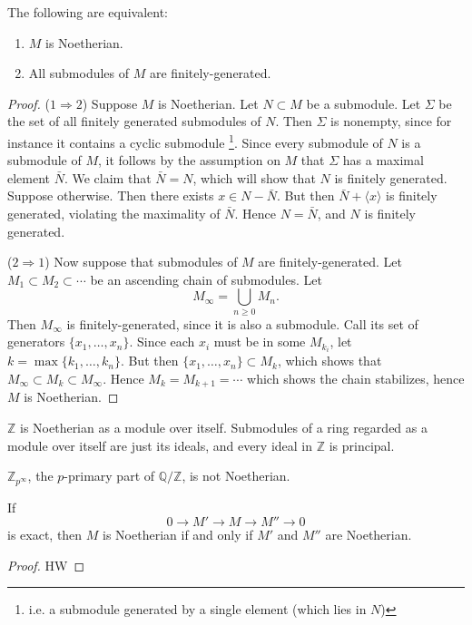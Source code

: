 \documentclass[12pt]{article}
\begin{document}
\begin{proposition}
	The following are equivalent:
	\begin{enumerate}
		\item $M$ is Noetherian.
		\item All submodules of $M$ are finitely-generated.
	\end{enumerate}
\end{proposition}
\begin{proof}
	($1\Rightarrow 2$) Suppose $M$ is Noetherian. Let $N\subset M$ be a submodule. Let $\Sigma$ be the set of all finitely generated submodules of $N$. Then $\Sigma$ is nonempty, since for instance it contains a cyclic submodule \footnote{i.e. a submodule generated by a single element (which lies in $N$)}. Since every submodule of $N$ is a submodule of $M$, it follows by the assumption on $M$ that $\Sigma$ has a maximal element $\bar{N}$. We claim that $\bar{N}=N$, which will show that $N$ is finitely generated. Suppose otherwise. Then there exists $x\in N-\bar{N}$. But then $\bar{N}+\langle x\rangle$ is finitely generated, violating the maximality of $\bar{N}$. Hence $N=\bar{N}$, and $N$ is finitely generated.

	($2\Rightarrow 1$) Now suppose that submodules of $M$ are finitely-generated. Let $M_1\subset M_2\subset\cdots$ be an ascending chain of submodules. Let 
	\begin{equation*}
		M_\infty = \bigcup_{n\geq 0}M_n.
	\end{equation*}
	Then $M_\infty$ is finitely-generated, since it is also a submodule. Call its set of generators $\{x_1,\dots,x_n\}$. Since each $x_i$ must be in some $M_{k_i}$, let $k=\max\{k_1,\dots,k_n\}$. But then $\{x_1,\dots,x_n\}\subset M_k$, which shows that $M_\infty\subset M_k\subset M_\infty$. Hence $M_k=M_{k+1}=\cdots$ which shows the chain stabilizes, hence $M$ is Noetherian.
\end{proof}

\begin{example}
	$\mathbb{Z}$ is Noetherian as a module over itself. Submodules of a ring regarded as a module over itself are just its ideals, and every ideal in $\mathbb{Z}$ is principal.
\end{example}

\begin{example}
	$\mathbb{Z}_{p^\infty}$, the $p$-primary part of $\mathbb{Q}/\mathbb{Z}$, is not Noetherian.
\end{example}

\begin{proposition}
	If 
	\begin{equation*}
		0 \to M' \to M \to M'' \to 0
	\end{equation*}
	is exact, then $M$ is Noetherian if and only if $M'$ and $M''$ are Noetherian.
\end{proposition} 
\begin{proof}
	HW 
\end{proof}
\end{document}
